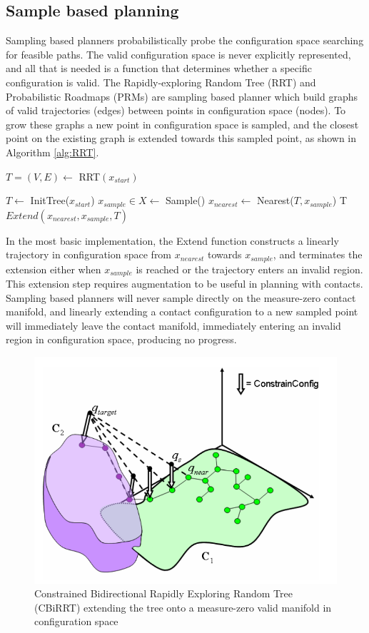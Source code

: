 \documentclass[../thesis.tex]{subfiles}
\begin{document}
\subsection{Sample based planning}
Sampling based planners probabilistically probe the configuration space searching for feasible paths.
The valid configuration space is never explicitly represented, and all that is needed is a function that determines whether a specific configuration is valid.
The Rapidly-exploring Random Tree (RRT) and Probabilistic Roadmaps (PRMs) are sampling based planner which build graphs of valid trajectories (edges) between points in configuration space (nodes).
To grow these graphs a new point in configuration space is sampled, and the closest point on the existing graph is extended towards this sampled point, as shown in Algorithm \ref{alg:RRT}. 
\cite{LaValle1998}

\begin{algorithm}
\caption{$T=(V,E) \leftarrow$ RRT$(x_{start})$}\label{alg:RRT}
\begin{algorithmic}[1]
\State $T \leftarrow$ InitTree($x_{start}$)
\State $x_{sample} \in X \leftarrow$ Sample()
\State $x_{nearest} \leftarrow $ Nearest($T, x_{sample}$)
\State T \leftarrow $Extend(x_{nearest}, x_{sample}, T)$
\EndWhile
\end{algorithmic}
\end{algorithm}

In the most basic implementation, the Extend function constructs a linearly trajectory in configuration space from $x_{nearest}$ towards $x_{sample}$, and terminates the extension either when $x_{sample}$ is reached or the trajectory enters an invalid region. \cite{LaValle1998}
This extension step requires augmentation to be useful in planning with contacts.
Sampling based planners will never sample directly on the measure-zero contact manifold, and linearly extending a contact configuration to a new sampled point will immediately leave the contact manifold, immediately entering an invalid region in configuration space, producing no progress.

\begin{figure}
  \centering
  \includegraphics[width=.5\linewidth]{./RelatedWork/CiBRRT.png}
  \caption{Constrained Bidirectional Rapidly Exploring Random Tree (CBiRRT) extending the tree onto a measure-zero valid manifold in configuration space}
  \label{fig:CiBRRT}
\end{figure}
\end{document}
